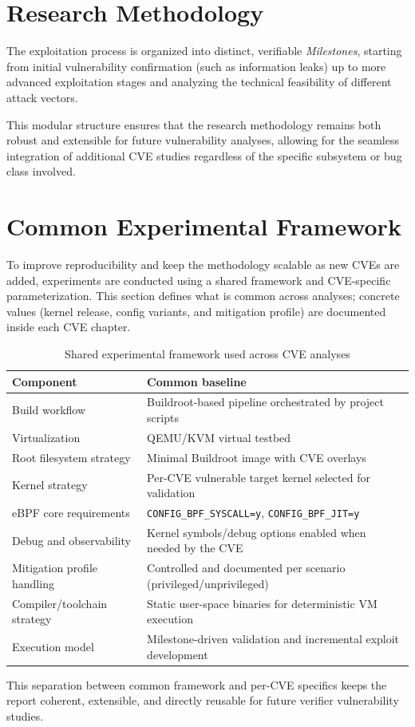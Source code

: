 \section{Research Methodology}
The exploitation process is organized into distinct, verifiable \textit{Milestones}, starting from initial vulnerability confirmation (such as information leaks) up to more advanced exploitation stages and analyzing the technical feasibility of different attack vectors. 

This modular structure ensures that the research methodology remains both robust and extensible for future vulnerability analyses, allowing for the seamless integration of additional CVE studies regardless of the specific subsystem or bug class involved.

\section{Common Experimental Framework}

To improve reproducibility and keep the methodology scalable as new CVEs are added, experiments are conducted using a shared framework and CVE-specific parameterization. This section defines what is common across analyses; concrete values (kernel release, config variants, and mitigation profile) are documented inside each CVE chapter.

\begin{table}[H]
\centering
\small
\begin{tabular}{@{}ll@{}}
\toprule
\textbf{Component} & \textbf{Common baseline} \\
\midrule
Build workflow & Buildroot-based pipeline orchestrated by project scripts \\
Virtualization & QEMU/KVM virtual testbed \\
Root filesystem strategy & Minimal Buildroot image with CVE overlays \\
Kernel strategy & Per-CVE vulnerable target kernel selected for validation \\
eBPF core requirements & \texttt{CONFIG\_BPF\_SYSCALL=y}, \texttt{CONFIG\_BPF\_JIT=y} \\
Debug and observability & Kernel symbols/debug options enabled when needed by the CVE \\
Mitigation profile handling & Controlled and documented per scenario (privileged/unprivileged) \\
Compiler/toolchain strategy & Static user-space binaries for deterministic VM execution \\
Execution model & Milestone-driven validation and incremental exploit development \\
\bottomrule
\end{tabular}
\caption{Shared experimental framework used across CVE analyses}
\end{table}

This separation between common framework and per-CVE specifics keeps the report coherent, extensible, and directly reusable for future verifier vulnerability studies.

